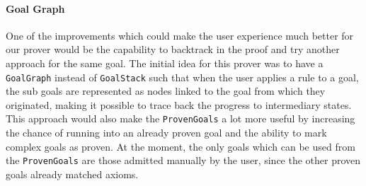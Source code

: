 \documentclass[12pt,a4paper]{article}
\begin{document}
{\paragraph{Goal Graph} One of the improvements which could make the user experience much better for our prover would be the capability to backtrack in the proof and try another approach for the same goal. The initial idea for this prover was to have a \texttt{GoalGraph} instead of \texttt{GoalStack} such that when the user applies a rule to a goal, the sub goals are represented as nodes linked to the goal from which they originated, making it possible to trace back the progress to intermediary states. This approach would also make the \texttt{ProvenGoals} a lot more useful by increasing the chance of running into an already proven goal and the ability to mark complex goals as proven. At the moment, the only goals which can be used from the \texttt{ProvenGoals} are those admitted manually by the user, since the other proven goals already matched axioms.
\clearpage
}
\end{document}
